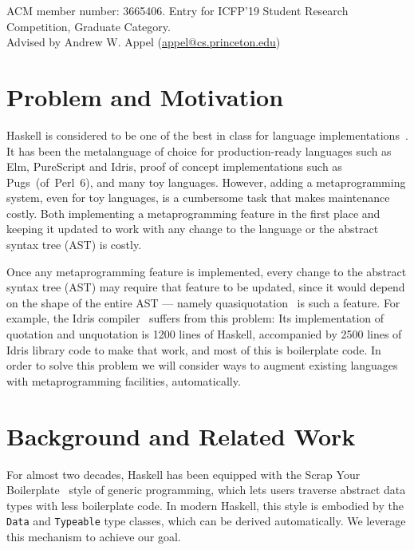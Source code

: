 \documentclass[format=acmsmall, review=false, screen=true]{acmart}
\newcommand{\CodeType}[1]{\textcolor{CodeBlue}{#1}}
\newcommand{\ty}[1]{\CodeType{\texttt{#1}}}
\begin{document}
\vspace{-2em}
\small{ACM member number: 3665406. Entry for ICFP'19 Student Research
Competition, Graduate Category.\\Advised by Andrew W. Appel (\href{mailto:appel@cs.princeton.edu}{appel@cs.princeton.edu})}
\normalsize



\section{Problem and Motivation}

Haskell is considered to be one of the best in class for language implementations~\cite{sotu}.
It has been the metalanguage of choice for production-ready languages such as Elm, PureScript and Idris, proof of concept implementations such as \mbox{Pugs (of Perl 6)}, and many toy languages.
However, adding a metaprogramming system, even for toy languages, is a cumbersome task that makes maintenance costly.
Both implementing a metaprogramming feature in the first place and keeping it updated to work with any change to the language or the abstract syntax tree (AST) is costly.

Once any metaprogramming feature is implemented, every change to the abstract syntax tree (AST) may require that feature to be updated, since it would depend on the shape of the entire AST --- namely quasiquotation~\cite{idrisQuotation} is such a feature.
For example, the Idris compiler~\cite{idris} suffers from this problem: Its implementation of quotation and unquotation is 1200 lines of Haskell, accompanied by 2500 lines of Idris library code to make that work, and most of this is boilerplate code. In order to solve this problem we will consider ways to augment existing languages with metaprogramming facilities, automatically.

\section{Background and Related Work}

For almost two decades, Haskell has been equipped with the Scrap Your
Boilerplate~\cite{syb,sybc} style of generic programming, which lets users traverse
abstract data types with less boilerplate code.
In modern Haskell, this style is embodied by the \ty{Data} and \ty{Typeable}
type classes, which can be derived automatically.
We leverage this mechanism to achieve our goal.
\end{document}
